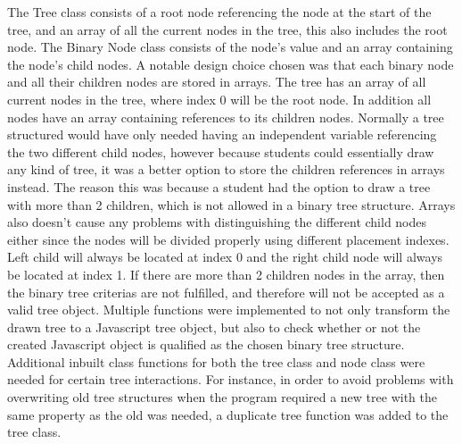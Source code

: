 The Tree class consists of a root node referencing the node at the start of the tree, and an array of all the current nodes in the tree, this also includes the root node. The Binary Node class consists of the node's value and an array containing the node's child nodes. A notable design choice chosen was that each binary node and all their children nodes are stored in arrays. The tree has an array of all current nodes in the tree, where index 0 will be the root node. In addition all nodes have an array containing references to its children nodes. Normally a tree structured would have only needed having an independent variable referencing the two different child nodes, however because students could essentially draw any kind of tree, it was a better option to store the children references in arrays instead. The reason this was because a student had the option to draw a tree with more than 2 children, which is not allowed in a binary tree structure. Arrays also doesn't cause any problems with distinguishing the different child nodes either since the nodes will be divided properly using different placement indexes. Left child will always be located at index 0 and the right child node will always be located at index 1. If there are more than 2 children nodes in the array, then the binary tree criterias are not fulfilled, and therefore will not be accepted as a valid tree object. Multiple functions were implemented to not only transform the drawn tree to a Javascript tree object, but also to check whether or not the created Javascript object is qualified as the chosen binary tree structure. Additional inbuilt class functions for both the tree class and node class were needed for certain tree interactions. For instance, in order to avoid problems with overwriting old tree structures when the program required a new tree with the same property as the old was needed, a duplicate tree function was added to the tree class.
